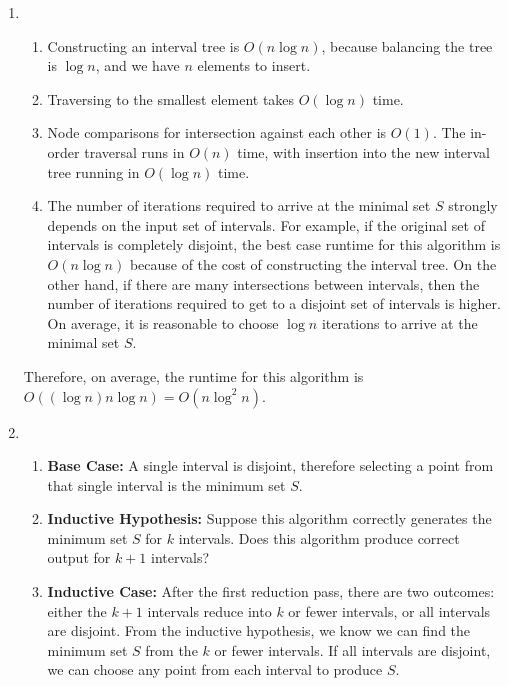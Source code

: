 \documentclass{article}
\begin{document}
\begin{enumerate}
\begin{enumerate}
            \item
                \begin{enumerate}
                    \item Constructing an interval tree is $O\left(n \log n\right)$, because balancing
                        the tree is $\log n$, and we have $n$ elements to insert.
                    \item Traversing to the smallest element takes $O\left(\log n\right)$ time.
                    \item Node comparisons for intersection against each other is $O\left(1\right)$. The in-order
                        traversal runs in $O\left(n\right)$ time, with insertion into the new interval tree
                        running in $O\left(\log n\right)$ time.
                    \item The number of iterations required to arrive at the minimal set $S$ strongly depends
                        on the input set of intervals. For example, if the original set of intervals is completely
                        disjoint, the best case runtime for this algorithm is $O\left(n\log n\right)$ because
                        of the cost of constructing the interval tree. On the
                        other hand, if there are many intersections between intervals, then the number of 
                        iterations required to get to a disjoint set of intervals is higher. On average,
                        it is reasonable to choose $\log n$ iterations to arrive at the minimal set $S$.
                \end{enumerate}
                
                Therefore, on average, the runtime for this algorithm is $O\left(\left(\log n\right) 
                n\log n\right) = O\left(n\log^2 n\right)$.
                
            \item
                \begin{enumerate}
                    \item \textbf{Base Case:} A single interval is disjoint, therefore selecting a point
                        from that single interval is the minimum set $S$.
                    \item \textbf{Inductive Hypothesis: } Suppose this algorithm correctly generates
                        the minimum set $S$ for $k$ intervals. Does this algorithm produce correct
                        output for $k + 1$ intervals?
                    \item \textbf{Inductive Case: }
                        After the first reduction pass, there are two outcomes: either the $k + 1$ 
                        intervals reduce into $k$ or fewer intervals, or all intervals are disjoint. From
                        the inductive hypothesis, we know we can find the minimum set $S$ from the $k$ or
                        fewer intervals. If all intervals are disjoint, we can choose any point from each
                        interval to produce $S$.
                \end{enumerate}
        \end{enumerate}
\end{enumerate}
\end{document}
